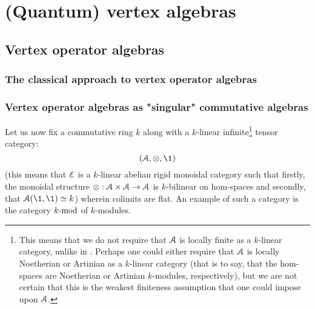 \section{(Quantum) vertex algebras}
    \subsection{Vertex operator algebras}
        \subsubsection{The classical approach to vertex operator algebras}
    
        \subsubsection{Vertex operator algebras as "singular" commutative algebras}
            \begin{convention}
                Let us now fix a commutative ring $k$ along with a $k$-linear infinite\footnote{This means that we do not require that $\calA$ is locally finite as a $k$-linear category, unlike in \cite[Definition 4.1.1]{EGNO}. Perhaps one could either require that $\calA$ is locally Noetherian or Artinian as a $k$-linear category (that is to say, that the hom-spaces are Noetherian or Artinian $k$-modules, respectively), but we are not certain that this is the weakest finiteness assumption that one could impose upon $\calA$.} tensor category:
                    $$(\calA, \tensor, \1)$$
                (this means that $\E$ is a $k$-linear abelian rigid monoidal category such that firstly, the monoidal structure $\tensor: \calA \x \calA \to \calA$ is $k$-bilinear on hom-spaces and secondly, that $\calA(\1, \1) \cong k$) wherein colimits are flat. An example of such a category is the category $k\mod$ of $k$-modules. 
            \end{convention}
